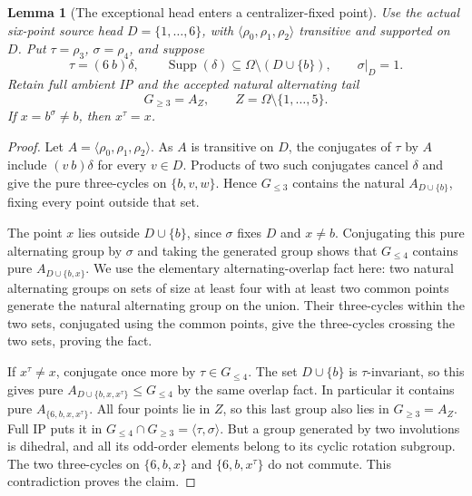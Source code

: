 \documentclass[11pt,a4paper]{article}
\newtheorem{lemma}{Lemma}
\newcommand{\gen}[1]{\langle#1\rangle}
\begin{document}
\begin{lemma}[The exceptional head enters a centralizer-fixed point]
\label{head}
Use the actual six-point source head
$D=\{1,\ldots,6\}$, with $\gen{\rho_0,\rho_1,\rho_2}$
transitive and supported on $D$. Put $\tau=\rho_3$,
$\sigma=\rho_4$, and suppose
\[
 \tau=(6\ b)\delta,\qquad
 \operatorname{Supp}(\delta)\subseteq\Omega\setminus(D\cup\{b\}),
 \qquad \sigma|_D=1.
\]
Retain full ambient IP and the accepted natural alternating tail
\[
              G_{\ge3}=A_Z,\qquad
              Z=\Omega\setminus\{1,\ldots,5\}.
\]
If $x=b^\sigma\ne b$, then $x^\tau=x$.
\end{lemma}
\begin{proof}
Let $A=\gen{\rho_0,\rho_1,\rho_2}$.
As $A$ is transitive on $D$, the conjugates of $\tau$ by $A$
include $(v\ b)\delta$ for every $v\in D$. Products of two
such conjugates cancel $\delta$ and give the pure three-cycles
on $\{b,v,w\}$. Hence $G_{\le3}$ contains the natural
$A_{D\cup\{b\}}$, fixing every point outside that set.

The point $x$ lies outside $D\cup\{b\}$, since $\sigma$
fixes $D$ and $x\ne b$. Conjugating this pure alternating group
by $\sigma$ and taking the generated group shows that $G_{\le4}$
contains pure $A_{D\cup\{b,x\}}$. We use the elementary
alternating-overlap fact here: two natural alternating groups
on sets of size at least four with at least two common points
generate the natural alternating group on the union. Their
three-cycles within the two sets, conjugated using the common
points, give the three-cycles crossing the two sets, proving the fact.

If $x^\tau\ne x$, conjugate once more by $\tau\in G_{\le4}$.
The set $D\cup\{b\}$ is $\tau$-invariant, so this gives pure
$A_{D\cup\{b,x,x^\tau\}}\le G_{\le4}$ by the same overlap fact.
In particular it contains pure $A_{\{6,b,x,x^\tau\}}$.
All four points lie in $Z$, so this last group also lies in
$G_{\ge3}=A_Z$. Full IP puts it in
$G_{\le4}\cap G_{\ge3}=\gen{\tau,\sigma}$.
But a group generated by two involutions is dihedral, and all
its odd-order elements belong to its cyclic rotation subgroup.
The two three-cycles on $\{6,b,x\}$ and $\{6,b,x^\tau\}$ do
not commute. This contradiction proves the claim.
\end{proof}
\end{document}
